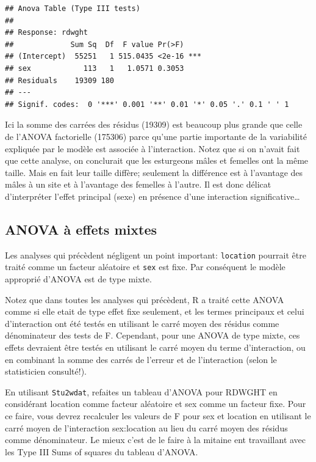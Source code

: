 \documentclass[
  12pt,
]{book}
\begin{document}
\begin{verbatim}
## Anova Table (Type III tests)
## 
## Response: rdwght
##             Sum Sq  Df  F value Pr(>F)    
## (Intercept)  55251   1 515.0435 <2e-16 ***
## sex            113   1   1.0571 0.3053    
## Residuals    19309 180                    
## ---
## Signif. codes:  0 '***' 0.001 '**' 0.01 '*' 0.05 '.' 0.1 ' ' 1
\end{verbatim}

Ici la somme des carrées des résidus (19309) est beaucoup plus grande que celle de l'ANOVA factorielle (175306) parce qu'une partie importante de la variabilité expliquée par le modèle est associée à l'interaction. Notez que si on n'avait fait que cette analyse, on conclurait que les esturgeons mâles et femelles ont la même taille. Mais en fait leur taille diffère; seulement la différence est à l'avantage des mâles à un site et à l'avantage des femelles à l'autre. Il est donc délicat d'interpréter l'effet principal (sexe) en présence d'une interaction significative\ldots{}

\hypertarget{anova-uxe0-effets-mixtes}{%
\subsection{ANOVA à effets mixtes}\label{anova-uxe0-effets-mixtes}}

Les analyses qui précèdent négligent un point important: \texttt{location} pourrait être traité comme un facteur aléatoire et \texttt{sex} est fixe. Par conséquent le modèle approprié d'ANOVA est de type mixte.

Notez que dans toutes les analyses qui précèdent, R a traité cette ANOVA comme si elle etait de type effet fixe seulement, et les termes principaux et celui d'interaction ont été testés en utilisant le carré moyen des résidus comme dénominateur des tests de F. Cependant, pour une ANOVA de type mixte, ces effets devraient être testés en utilisant le carré moyen du terme d'interaction, ou en combinant la somme des carrés de l'erreur et de l'interaction (selon le statisticien consulté!).

En utilisant \texttt{Stu2wdat}, refaites un tableau d'ANOVA pour RDWGHT en considérant location comme facteur aléatoire et sex comme un facteur fixe. Pour ce faire, vous devrez recalculer les valeurs de F pour sex et location en utilisant le carré moyen de l'interaction sex:location au lieu du carré moyen des résidus comme dénominateur. Le mieux c'est de le faire à la mitaine ent travaillant avec les Type III Sums of squares du tableau d'ANOVA.
\end{document}
